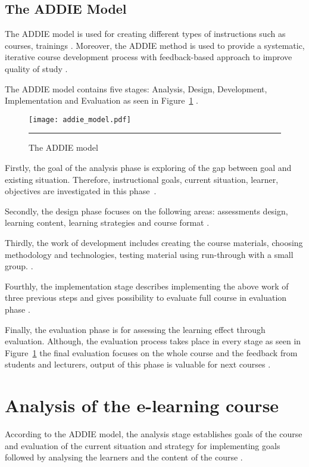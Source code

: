 \subsection{The ADDIE Model}

The \gls{ADDIE} model is used for creating different types of instructions such as courses, trainings \citep{website:addie, lohr1998using}. Moreover, the ADDIE method is  used to provide a systematic, iterative course development process with feedback-based approach to improve quality of study \citep{website:using_addie}.

The ADDIE model contains five stages: Analysis, Design, Development, Implementation and Evaluation as seen in Figure~\ref{figure:the addie model} \citep{website:addie}.


\begin{figure}[H]
 \centering 
 \texttt{[image: addie\_model.pdf]}
 \rule{35em}{0.5pt} 
 \caption{The ADDIE model} 
 \label{figure:the addie model} 
\end{figure}

Firstly, the goal of the analysis phase is exploring of the gap between goal and existing situation. Therefore, instructional goals, current situation, learner, objectives are investigated in this phase~\citep{chen2007learning, website:addie}.

Secondly, the design phase focuses on the following areas: assessments design, learning content, learning strategies and course format \citep{chen2007learning, website:addie}.


Thirdly, the work of development includes creating the course materials, choosing methodology and technologies, testing material using run-through with a small group. \citep{OppeArenduskeskus2010, website:addie, chen2007learning}.


Fourthly, the implementation stage describes implementing the above work of three previous steps and gives possibility to evaluate full course in evaluation phase \citep{chen2007learning, website:addie}.


Finally, the evaluation phase is for assessing the learning effect through evaluation. Although, the evaluation process takes place in every stage as seen in Figure~\ref{figure:the addie model} the final evaluation focuses on the whole course and the feedback from students and lecturers, output of this phase is valuable for next courses \citep{OppeArenduskeskus2010, website:addie}.

\section{Analysis of the e-learning course}
According to the \gls{ADDIE} model, the analysis stage establishes goals of the course and evaluation of the current situation and strategy for implementing goals followed by analysing the learners and the content of the course \citep{website:addie}.


